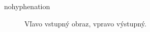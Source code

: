 \begin{hyphenrules}{nohyphenation}
\begin{figure}[H]
\begin{minipage}[t]{.4\linewidth}
\caption{Vľavo vstupný obraz, vpravo výstupný.}
\label{fig:4.5} 
\end{minipage}\hfill
\begin{minipage}[b]{.4\linewidth}

\end{minipage}
\end{figure}
\end{hyphenrules}

